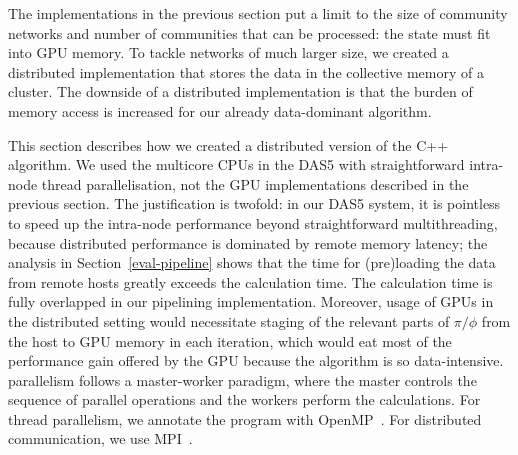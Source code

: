 \begin{comment}
- pi storage: DKV
   . pi/phi is read in 3), 4), 5a), 7)
   . pi is written in 4); read[i], then write[i], so no other data dependencies
   . so access is very synchronous: either read-only, or write without
     concurrent readers
   . DKV store properties:
      - single-sized keys
      - contiguous key space (integers 0..N-1)
      - update-only writes: no new KVs, no deletes
     so: no load imbalance, no hashing that is worth its name
      - no read/write or write/write concurrency
     so:
      - build RDMA store with remote reads and remote writes only, with exactly
        one RDMA transaction per read or write
\end{comment}



The implementations in the previous section put a limit to the size of
community networks and number of communities that can be processed: the
state must fit into GPU memory. To tackle networks of much larger size, we
created a distributed implementation that stores the data in the
collective memory of a cluster. The downside of a distributed implementation
is that the burden of memory access is increased for our already data-dominant
algorithm.


This section describes how we created a distributed version of the C++
algorithm. We used the multicore CPUs in the DAS5 with straightforward
intra-node thread parallelisation, not the GPU implementations described
in the previous section. The justification is twofold: in our DAS5 system,
it is pointless to speed up the intra-node performance beyond straightforward
multithreading, because distributed performance is dominated by remote memory
latency; the analysis in Section~\ref{eval-pipeline} shows that the time for
(pre)loading the data from remote hosts greatly exceeds the calculation time.
The calculation time is fully overlapped in our pipelining implementation.
Moreover, usage of GPUs in the distributed setting would necessitate staging of
the relevant parts of $\pi/\phi$ from the host to GPU memory in each iteration,
which would eat most of the performance gain offered by the GPU because
the algorithm is so data-intensive.  %
parallelism %
follows a master-worker paradigm, where the master controls the sequence of
parallel operations and the workers perform the calculations. For thread
parallelism, we annotate the program with OpenMP~\cite{OpenMPSpec}. For
distributed communication, we use MPI~\cite{Forum:1994:MMI:898758}.

